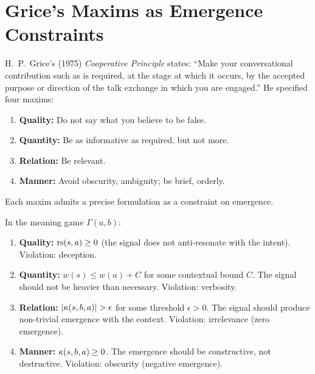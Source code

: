 \section{Grice's Maxims as Emergence Constraints}

H.~P.~Grice's (1975) \emph{Cooperative Principle} states: ``Make your
conversational contribution such as is required, at the stage at which it
occurs, by the accepted purpose or direction of the talk exchange in which
you are engaged.'' He specified four maxims:
\begin{enumerate}
\item \textbf{Quality:} Do not say what you believe to be false.
\item \textbf{Quantity:} Be as informative as required, but not more.
\item \textbf{Relation:} Be relevant.
\item \textbf{Manner:} Avoid obscurity, ambiguity; be brief, orderly.
\end{enumerate}

Each maxim admits a precise formulation as a constraint on emergence.

\begin{theorem}
\label{thm:grice-formalized}
In the meaning game $\Gamma(a, b)$:
\begin{enumerate}
\item \textbf{Quality:} $\mathrm{rs}(s, a) \geq 0$ (the signal does not anti-resonate
with the intent). Violation: deception.
\item \textbf{Quantity:} $w(s) \leq w(a) + C$ for some contextual bound $C$.
The signal should not be heavier than necessary. Violation: verbosity.
\item \textbf{Relation:} $|\kappa(s, b, a)| > \epsilon$ for some threshold
$\epsilon > 0$. The signal should produce non-trivial emergence with the
context. Violation: irrelevance (zero emergence).
\item \textbf{Manner:} $\kappa(s, b, a) \geq 0$. The emergence should be
constructive, not destructive. Violation: obscurity (negative emergence).
\end{enumerate}
\end{theorem}


